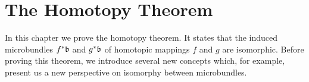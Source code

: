 \chapter{The Homotopy Theorem}
\begin{myparagraph}
    In this chapter we prove the homotopy theorem.
    It states that the induced microbundles $f^*\mathfrak{b}$ and $g^*\mathfrak{b}$ of homotopic mappings $f$ and $g$ are isomorphic.
    Before proving this theorem, we introduce several new concepts which, for example, present us a new perspective on isomorphy between microbundles.
\end{myparagraph}





